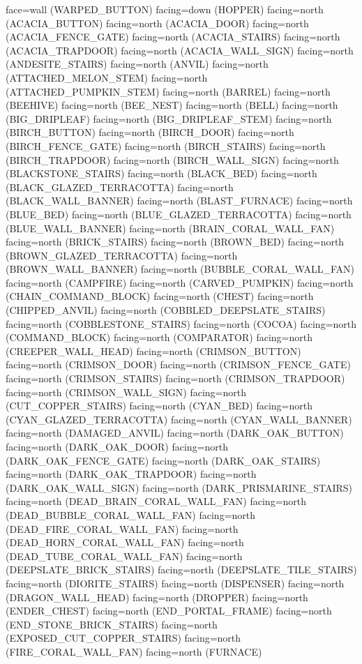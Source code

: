 \documentclass[11pt]{article}
\begin{document}
face=wall (WARPED_BUTTON)
facing=down (HOPPER)
facing=north (ACACIA_BUTTON)
facing=north (ACACIA_DOOR)
facing=north (ACACIA_FENCE_GATE)
facing=north (ACACIA_STAIRS)
facing=north (ACACIA_TRAPDOOR)
facing=north (ACACIA_WALL_SIGN)
facing=north (ANDESITE_STAIRS)
facing=north (ANVIL)
facing=north (ATTACHED_MELON_STEM)
facing=north (ATTACHED_PUMPKIN_STEM)
facing=north (BARREL)
facing=north (BEEHIVE)
facing=north (BEE_NEST)
facing=north (BELL)
facing=north (BIG_DRIPLEAF)
facing=north (BIG_DRIPLEAF_STEM)
facing=north (BIRCH_BUTTON)
facing=north (BIRCH_DOOR)
facing=north (BIRCH_FENCE_GATE)
facing=north (BIRCH_STAIRS)
facing=north (BIRCH_TRAPDOOR)
facing=north (BIRCH_WALL_SIGN)
facing=north (BLACKSTONE_STAIRS)
facing=north (BLACK_BED)
facing=north (BLACK_GLAZED_TERRACOTTA)
facing=north (BLACK_WALL_BANNER)
facing=north (BLAST_FURNACE)
facing=north (BLUE_BED)
facing=north (BLUE_GLAZED_TERRACOTTA)
facing=north (BLUE_WALL_BANNER)
facing=north (BRAIN_CORAL_WALL_FAN)
facing=north (BRICK_STAIRS)
facing=north (BROWN_BED)
facing=north (BROWN_GLAZED_TERRACOTTA)
facing=north (BROWN_WALL_BANNER)
facing=north (BUBBLE_CORAL_WALL_FAN)
facing=north (CAMPFIRE)
facing=north (CARVED_PUMPKIN)
facing=north (CHAIN_COMMAND_BLOCK)
facing=north (CHEST)
facing=north (CHIPPED_ANVIL)
facing=north (COBBLED_DEEPSLATE_STAIRS)
facing=north (COBBLESTONE_STAIRS)
facing=north (COCOA)
facing=north (COMMAND_BLOCK)
facing=north (COMPARATOR)
facing=north (CREEPER_WALL_HEAD)
facing=north (CRIMSON_BUTTON)
facing=north (CRIMSON_DOOR)
facing=north (CRIMSON_FENCE_GATE)
facing=north (CRIMSON_STAIRS)
facing=north (CRIMSON_TRAPDOOR)
facing=north (CRIMSON_WALL_SIGN)
facing=north (CUT_COPPER_STAIRS)
facing=north (CYAN_BED)
facing=north (CYAN_GLAZED_TERRACOTTA)
facing=north (CYAN_WALL_BANNER)
facing=north (DAMAGED_ANVIL)
facing=north (DARK_OAK_BUTTON)
facing=north (DARK_OAK_DOOR)
facing=north (DARK_OAK_FENCE_GATE)
facing=north (DARK_OAK_STAIRS)
facing=north (DARK_OAK_TRAPDOOR)
facing=north (DARK_OAK_WALL_SIGN)
facing=north (DARK_PRISMARINE_STAIRS)
facing=north (DEAD_BRAIN_CORAL_WALL_FAN)
facing=north (DEAD_BUBBLE_CORAL_WALL_FAN)
facing=north (DEAD_FIRE_CORAL_WALL_FAN)
facing=north (DEAD_HORN_CORAL_WALL_FAN)
facing=north (DEAD_TUBE_CORAL_WALL_FAN)
facing=north (DEEPSLATE_BRICK_STAIRS)
facing=north (DEEPSLATE_TILE_STAIRS)
facing=north (DIORITE_STAIRS)
facing=north (DISPENSER)
facing=north (DRAGON_WALL_HEAD)
facing=north (DROPPER)
facing=north (ENDER_CHEST)
facing=north (END_PORTAL_FRAME)
facing=north (END_STONE_BRICK_STAIRS)
facing=north (EXPOSED_CUT_COPPER_STAIRS)
facing=north (FIRE_CORAL_WALL_FAN)
facing=north (FURNACE)
\end{document}
